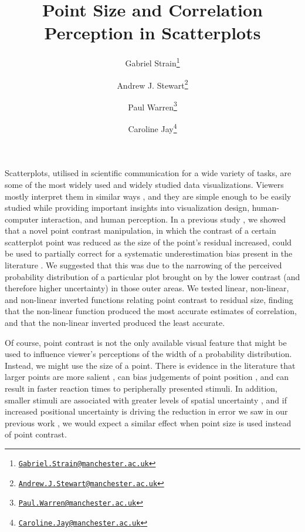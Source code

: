 \documentclass{vgtc}                          %
\title{Point Size and Correlation Perception in Scatterplots}
\author{Gabriel Strain\thanks{\href{mailto:Gabriel.Strain@manchester.ac.uk}{\nolinkurl{Gabriel.Strain@manchester.ac.uk}}} %
\and Andrew J. Stewart\thanks{\href{mailto:Andrew.J.Stewart@manchester.ac.uk}{\nolinkurl{Andrew.J.Stewart@manchester.ac.uk}}} %
\and Paul Warren\thanks{\href{mailto:Paul.Warren@manchester.ac.uk}{\nolinkurl{Paul.Warren@manchester.ac.uk}}} %
\and Caroline Jay\thanks{\href{mailto:Caroline.Jay@manchester.ac.uk}{\nolinkurl{Caroline.Jay@manchester.ac.uk}}}} %
\affiliation{\scriptsize The University of Manchester}
\begin{document}


\maketitle

Scatterplots, utilised in scientific communication for a wide variety of tasks,
are some of the most widely used and widely studied data visualizations. Viewers
mostly interpret them in similar ways \cite{kay_heer_2015}, and they are simple
enough to be easily studied while providing important insights into visualization
design, human-computer interaction, and human perception. In a previous study \cite{strain_2023},
we showed that a novel point contrast manipulation, in which the contrast of a certain
scatterplot point was reduced as the size of the point's residual increased, could be
used to partially correct for a systematic underestimation bias present in the
literature . We suggested that this was due to the narrowing
of the perceived probability distribution of a particular plot brought
on by the lower contrast (and therefore higher uncertainty) in those outer
areas. We tested linear, non-linear, and non-linear inverted functions relating
point contrast to residual size, finding that the non-linear function produced
the most accurate estimates of correlation, and that the non-linear inverted produced
the least accurate.

Of course, point contrast is not the only available visual feature that might be used
to influence viewer's perceptions of the width of a probability distribution. Instead,
we might use the size of a point. There is evidence in the literature that larger points
are more salient \cite{healey_2012}, can bias judgements of point position
\cite{hong_2021}, and can result in faster reaction times \cite{grice_1983} to
peripherally presented stimuli. In addition, smaller stimuli are associated with
greater levels of spatial uncertainty \cite{alais_2004}, and if increased positional
uncertainty is driving the reduction in error we saw in our previous work \cite{strain_2023},
we would expect a similar effect when point size is used instead of point contrast.
\end{document}
